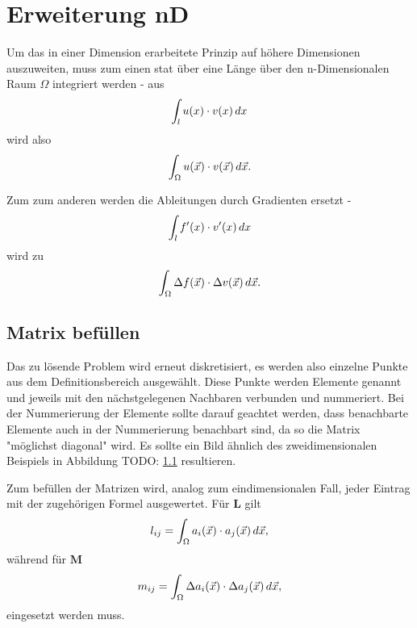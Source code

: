 %
%
%
%
\section{Erweiterung nD\label{fem:erweiterung_nD}}
Um das in einer Dimension erarbeitete Prinzip auf höhere Dimensionen auszuweiten, muss zum einen stat über eine Länge über den n-Dimensionalen Raum $\Omega$ integriert werden -
aus 
\begin{equation}
    \int_{l} u(x) \cdot v(x) \, d x
\end{equation}
wird also
\begin{equation}
    \int_{\Omega} u(\vec{x}) \cdot v(\vec{x}) \, d \vec{x}.
\end{equation}

Zum zum anderen werden die Ableitungen durch Gradienten ersetzt - 
\begin{equation}
    \int_{l} f'(x) \cdot v'(x) \, d x
\end{equation}
wird zu
\begin{equation}
    \int_{\Omega} \Delta f(\vec{x}) \cdot \Delta v(\vec{x}) \, d \vec{x}.
\end{equation}


\subsection{Matrix befüllen}
Das zu lösende Problem wird erneut diskretisiert, es werden also einzelne Punkte aus dem Definitionsbereich ausgewählt.
Diese Punkte werden Elemente genannt und jeweils mit den nächstgelegenen Nachbaren verbunden und nummeriert. 
Bei der Nummerierung der Elemente sollte darauf geachtet werden, dass benachbarte Elemente auch in der Nummerierung benachbart sind, da so die Matrix "möglichst diagonal" wird. %
Es sollte ein Bild ähnlich des zweidimensionalen Beispiels in Abbildung TODO: \ref{} resultieren. %

Zum befüllen der Matrizen wird, analog zum eindimensionalen Fall, jeder Eintrag mit der zugehörigen Formel ausgewertet.
Für $\mathbf{L}$ gilt
\begin{equation}
    l_{ij} = \int_{\Omega} a_i(\vec{x}) \cdot a_j(\vec{x}) \, d \vec{x},
\end{equation}
während für $\mathbf{M}$ 
\begin{equation}
    m_{ij} = \int_{\Omega} \Delta a_i(\vec{x}) \cdot \Delta a_j(\vec{x}) \, d \vec{x},
\end{equation}
eingesetzt werden muss.

